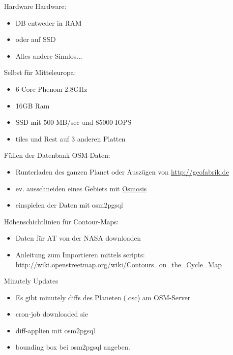 \documentclass{beamer}
\begin{document}
\begin{frame}{Hardware}
Hardware:

\begin{itemize}
  \item DB entweder in RAM
  \item oder auf SSD
    \pause
  \item Alles andere Sinnlos...
\end{itemize}

Selbst für Mitteleuropa:
\begin{itemize}
          \item 6-Core Phenom 2.8GHz
          \item 16GB Ram
          \item SSD mit 500 MB/sec und 85000 IOPS
          \item tiles und Rest auf 3 anderen Platten
\end{itemize}
\end{frame}

\begin{frame}{Füllen der Datenbank}
OSM-Daten:
\begin{itemize}
        \item Runterladen des ganzen Planet oder Auszügen von \url{http://geofabrik.de}
	\item ev. ausschneiden eines Gebiets mit \href{http://wiki.openstreetmap.org/wiki/Osmosis}{Osmosis}
	\item einspielen der Daten mit osm2pgsql
\end{itemize}
Höhenschichtlinien für Contour-Maps:
\begin{itemize}
        \item Daten für AT von der NASA downloaden
	\item Anleitung zum Importieren mittels scripts: \url{http://wiki.openstreetmap.org/wiki/Contours\_on\_the\_Cycle\_Map}
\end{itemize}

\end{frame}

\begin{frame}{Minutely Updates}
\begin{itemize}
        \item Es gibt minutely diffs des Planeten (.osc) am OSM-Server
	\item cron-job downloaded sie
 	\item diff-applien mit osm2pgsql
	\item bounding box bei osm2pgsql angeben.
\end{itemize}

\end{frame}
\end{document}
